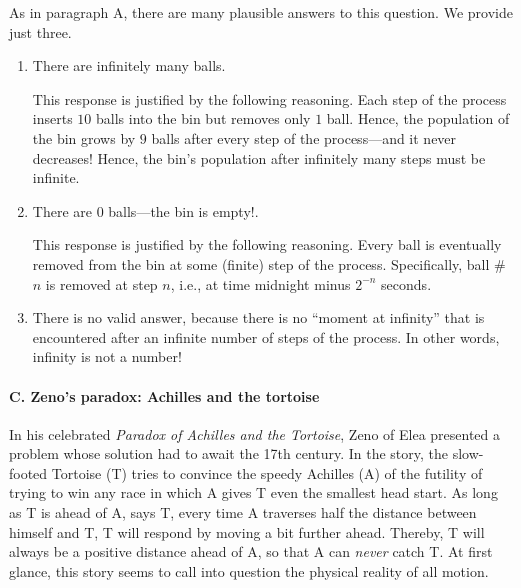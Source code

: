 \noindent
As in paragraph {\small\sf A}, there are many plausible answers to
this question.  We provide just three.
\begin{enumerate}
\item
There are infinitely many balls.

This response is justified by the following reasoning.  Each step of
the process inserts $10$ balls into the bin but removes only $1$ ball.
Hence, the population of the bin grows by $9$ balls after every step
of the process---and it never decreases!  Hence, the bin's population
after infinitely many steps must be infinite.

\item
There are $0$ balls---the bin is empty!.

This response is justified by the following reasoning.  Every ball is
eventually removed from the bin at some (finite) step of the process.
Specifically, ball \#$n$ is removed at step $n$, i.e., at time
midnight minus $2^{-n}$ seconds.

\item
There is no valid answer, because there is no ``moment at infinity''
that is encountered after an infinite number of steps of the process.
In other words, infinity is not a number!
\end{enumerate}


\paragraph{\small\sf C.  Zeno's paradox: Achilles and the tortoise}

In his celebrated {\it Paradox of Achilles and the Tortoise}, Zeno of
Elea   presented a
problem whose solution had to await the 17th century.  In the story,
the slow-footed Tortoise (T) tries to convince the speedy Achilles (A)
of the futility of trying to win any race in which A gives T even the
smallest head start.  As long as T is ahead of A, says T, every time A
traverses half the distance between himself and T, T will respond by
moving a bit further ahead.  Thereby, T will always be a positive
distance ahead of A, so that A can {\em never} catch T.  At first
glance, this story seems to call into question the physical reality of
all motion.

